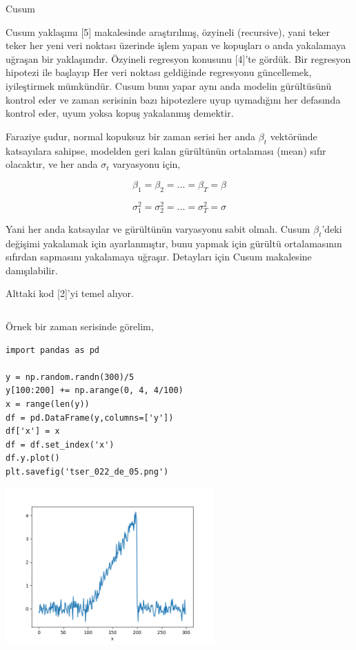 \documentclass[12pt,fleqn]{article}\usepackage{../../common}
\begin{document}
Cusum

Cusum yaklaşımı [5] makalesinde araştırılmış, özyineli (recursive), yani teker
teker her yeni veri noktası üzerinde işlem yapan ve kopuşları o anda yakalamaya
uğraşan bir yaklaşımdır. Özyineli regresyon konusunu [4]'te gördük. Bir
regresyon hipotezi ile başlayıp Her veri noktası geldiğinde regresyonu
güncellemek, iyileştirmek mümkündür. Cusum bunu yapar aynı anda modelin
gürültüsünü kontrol eder ve zaman serisinin bazı hipotezlere uyup uymadığını
her defasında kontrol eder, uyum yoksa kopuş yakalanmış demektir.

Faraziye şudur, normal kopuksuz bir zaman serisi her anda $\beta_t$ vektöründe
katsayılara sahipse, modelden geri kalan gürültünün ortalaması (mean) sıfır
olacaktır, ve her anda $\sigma_t$ varyasyonu için,

$$
\beta_1 = \beta_2 = ... = \beta_T = \beta
$$

$$
\sigma_1^2 = \sigma_2^2 = ... = \sigma_T^2 = \sigma
$$

Yani her anda katsayılar ve gürültünün varyasyonu sabit olmalı. Cusum
$\beta_t$'deki değişimi yakalamak için ayarlanmıştır, bunu yapmak için gürültü
ortalamasının sıfırdan sapmasını yakalamaya uğraşır. Detayları için Cusum
makalesine danışılabilir.

Alttaki kod [2]'yi temel alıyor. 

\inputminted[fontsize=\footnotesize]{python}{cusum.py}

Örnek bir zaman serisinde görelim,

\begin{verbatim}
import pandas as pd
  
y = np.random.randn(300)/5
y[100:200] += np.arange(0, 4, 4/100)
x = range(len(y))
df = pd.DataFrame(y,columns=['y'])
df['x'] = x
df = df.set_index('x')
df.y.plot()
plt.savefig('tser_022_de_05.png')
\end{verbatim}

\includegraphics[height=6cm]{tser_022_de_05.png}
\end{document}
